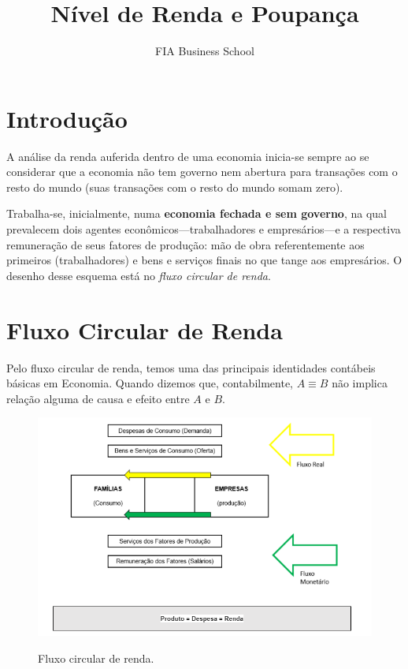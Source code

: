 \documentclass{article}\usepackage[]{graphicx}\usepackage[]{xcolor}
\title{Nível de Renda e Poupança}
\author{FIA Business School}
\begin{document}
\maketitle
\section*{Introdução}

A análise da renda auferida dentro de uma economia inicia-se sempre ao se considerar que a economia
não tem governo nem abertura para transações com o resto do mundo (suas transações com o resto do mundo somam zero).\par

Trabalha-se, inicialmente, numa \textbf{economia fechada e sem governo}, na qual prevalecem dois agentes
econômicos---trabalhadores e empresários---e a respectiva remuneração de seus fatores de produção:
mão de obra referentemente aos primeiros (trabalhadores) e bens e serviços finais no que tange aos empresários.
O desenho desse esquema está no \textit{fluxo circular de renda}.\par

\section*{Fluxo Circular de Renda}

Pelo fluxo circular de renda, temos uma das principais identidades contábeis básicas em Economia.
Quando dizemos que, contabilmente, \( A \equiv B \) não implica relação alguma de causa e efeito entre \( A \) e \( B \).\par

\begin{figure}[H]
\includegraphics[width=12cm]{fluxo-circular}
\centering
\label{fluxo-circular}
\caption{Fluxo circular de renda.}
\end{figure}
\end{document}
